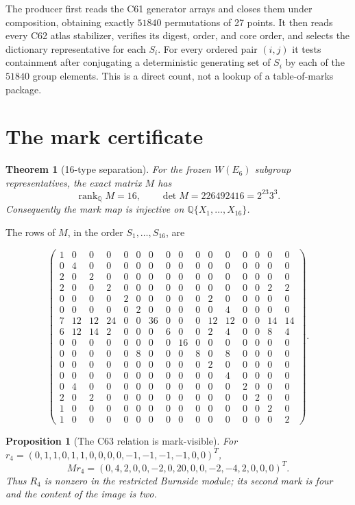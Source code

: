 \documentclass[10pt]{article}
\newtheorem{theorem}{Theorem}
\newtheorem{proposition}{Proposition}
\newcommand{\Q}{\mathbb Q}
\begin{document}
The producer first reads the C61 generator arrays and closes them under
composition, obtaining exactly $51840$ permutations of 27 points.  It then
reads every C62 atlas stabilizer, verifies its digest, order, and core order,
and selects the dictionary representative for each $S_i$.  For every ordered
pair $(i,j)$ it tests containment after conjugating a deterministic generating
set of $S_i$ by each of the $51840$ group elements.  This is a direct count,
not a lookup of a table-of-marks package.

\section{The mark certificate}
\begin{theorem}[16-type separation]
For the frozen $W(E_6)$ subgroup representatives, the exact matrix $M$ has
\[
 \operatorname{rank}_{\Q}M=16,
 \qquad \det M=226492416=2^{23}3^3.
\]
Consequently the mark map is injective on
$\Q\{X_1,\ldots,X_{16}\}$.
\end{theorem}

The rows of $M$, in the order $S_1,\ldots,S_{16}$, are
\begin{small}
\[
\begin{pmatrix}
1&0&0&0&0&0&0&0&0&0&0&0&0&0&0&0\\
0&4&0&0&0&0&0&0&0&0&0&0&0&0&0&0\\
2&0&2&0&0&0&0&0&0&0&0&0&0&0&0&0\\
2&0&0&2&0&0&0&0&0&0&0&0&0&0&2&2\\
0&0&0&0&2&0&0&0&0&0&2&0&0&0&0&0\\
0&0&0&0&0&2&0&0&0&0&0&4&0&0&0&0\\
7&12&12&24&0&0&36&0&0&0&12&12&0&0&14&14\\
6&12&14&2&0&0&0&6&0&0&2&4&0&0&8&4\\
0&0&0&0&0&0&0&0&16&0&0&0&0&0&0&0\\
0&0&0&0&0&8&0&0&0&8&0&8&0&0&0&0\\
0&0&0&0&0&0&0&0&0&0&2&0&0&0&0&0\\
0&0&0&0&0&0&0&0&0&0&0&4&0&0&0&0\\
0&4&0&0&0&0&0&0&0&0&0&0&2&0&0&0\\
2&0&2&0&0&0&0&0&0&0&0&0&0&2&0&0\\
1&0&0&0&0&0&0&0&0&0&0&0&0&0&2&0\\
1&0&0&0&0&0&0&0&0&0&0&0&0&0&0&2
\end{pmatrix}.
\]
\end{small}

\begin{proposition}[The C63 relation is mark-visible]
For $r_4=(0,1,1,0,1,1,0,0,0,0,-1,-1,-1,-1,0,0)^T$,
\[
Mr_4=(0,4,2,0,0,-2,0,20,0,0,-2,-4,2,0,0,0)^T.
\]
Thus $R_4$ is nonzero in the restricted Burnside module; its second mark is
four and the content of the image is two.
\end{proposition}
\end{document}

